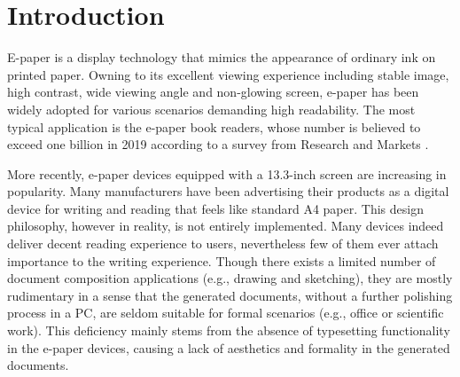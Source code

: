 \documentclass[]{sigchi}
\begin{document}
\begin{abstract}



\end{abstract}

\section{Introduction}
E-paper is a display technology that mimics the appearance of ordinary ink on printed paper. 
Owning to its excellent viewing experience including stable image, high contrast, wide viewing angle and non-glowing screen, e-paper has been widely adopted for various scenarios demanding high readability. The most typical application is the e-paper book readers, whose number is believed to exceed one billion in 2019 according to a survey from Research and Markets \cite{researchmarket}. 

More recently, e-paper devices equipped with a 13.3-inch screen are increasing in popularity. 
Many manufacturers have been advertising their products as a digital device for writing and reading that feels like standard A4 paper.
This design philosophy, however in reality, is not entirely implemented.
Many devices indeed deliver decent reading experience to users, nevertheless few of them ever attach importance to the writing experience.
Though there exists a limited number of document composition applications (e.g., drawing and sketching), they are mostly rudimentary in a sense that the generated documents, without a further polishing process in a PC, are seldom suitable for formal scenarios (e.g., office or scientific work).
This deficiency mainly stems from the absence of typesetting functionality in the e-paper devices, causing a lack of aesthetics and formality in the generated documents.
\end{document}
